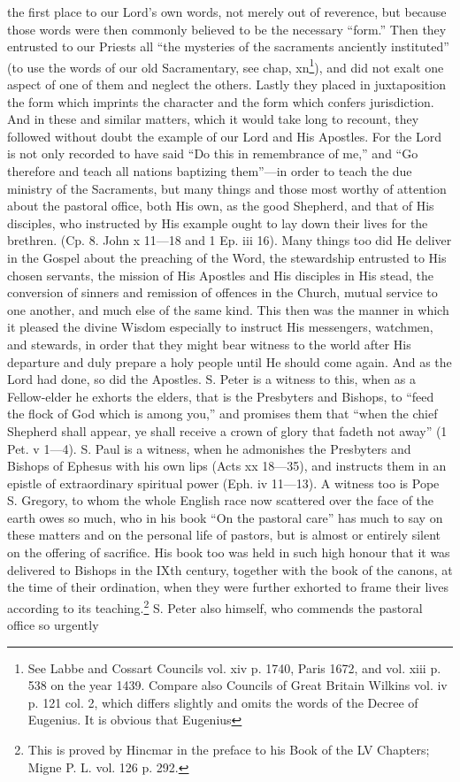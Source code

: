the first place to our Lord’s own words, not merely out of reverence, but because those words were then commonly believed to be the necessary “form.” Then they entrusted to our Priests all “the mysteries of the sacraments anciently instituted” (to use the words of our old Sacramentary, see chap, xn\footnote{See Labbe and Cossart Councils vol. xiv p. 1740, Paris 1672, and vol. xiii p. 538 on the year 1439. Compare also Councils of Great Britain Wilkins vol. iv p. 121 col. 2, which differs slightly and omits the words of the Decree of Eugenius. It is obvious that Eugenius}), and did not exalt one aspect of one of them and neglect the others. Lastly they placed in juxtaposition the form which imprints the character and the form which confers jurisdiction. And in these and similar matters, which it would take long to recount, they followed without doubt the example of our Lord and His Apostles. For the Lord is not only recorded to have said “Do this in remembrance of me,” and “Go therefore and teach all nations baptizing them”—in order to teach the due ministry of the Sacraments, but many things and those most worthy of attention about the pastoral office, both His own, as the good Shepherd, and that of His disciples, who instructed by His example ought to lay down their lives for the brethren. (Cp. 8. John x 11—18 and 1 Ep. iii 16). Many things too did He deliver in the Gospel about the preaching of the Word, the stewardship entrusted to His chosen servants, the mission of His Apostles and His disciples in His stead, the conversion of sinners and remission of offences in the Church, mutual service to one another, and much else of the same kind. This then was the manner in which it pleased the divine Wisdom especially to instruct His messengers, watchmen, and stewards, in order that they might bear witness to the world after His departure and duly prepare a holy people until He should come again. And as the Lord had done, so did the Apostles. S. Peter is a witness to this, when as a Fellow-elder he exhorts the elders, that is the Presbyters and Bishops, to “feed the flock of God which is among you,” and promises them that “when the chief Shepherd shall appear, ye shall receive a crown of glory that fadeth not away” (1 Pet. v 1—4). S. Paul is a witness, when he admonishes the Presbyters and Bishops of Ephesus with his own lips (Acts xx 18—35), and instructs them in an epistle of extraordinary spiritual power (Eph. iv 11—13). A witness too is Pope S. Gregory, to whom the whole English race now scattered over the face of the earth owes so much, who in his book “On the pastoral care” has much to say on these matters and on the personal life of pastors, but is almost or entirely silent on the offering of sacrifice. His book too was held in such high honour that it was delivered to Bishops in the IXth century, together with the book of the canons, at the time of their ordination, when they were further exhorted to frame their lives according to its teaching.\footnote{This is proved by Hincmar in the preface to his Book of the LV Chapters; Migne P. L. vol. 126 p. 292.} S. Peter also himself, who commends the pastoral office so urgently

